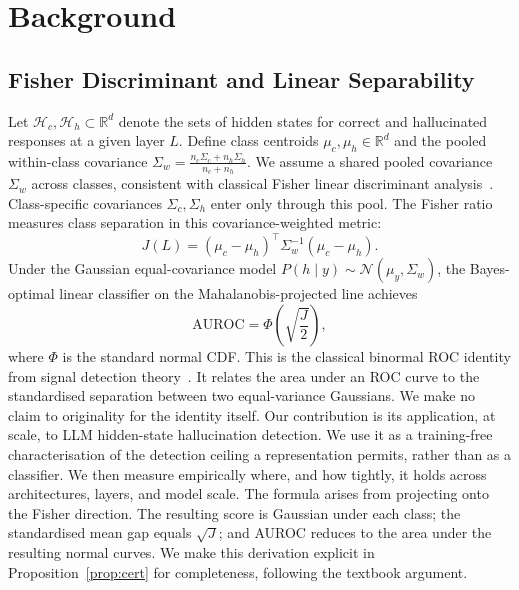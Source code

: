 \documentclass[10pt,twocolumn]{article}
\newcommand{\FloatBarrier}{\clearpage}
\begin{document}
\FloatBarrier
\section{Background}
\label{sec:background}

\subsection{Fisher Discriminant and Linear Separability}
\label{sec:background-fisher}

Let $\mathcal{H}_c, \mathcal{H}_h \subset \mathbb{R}^d$ denote the sets of
hidden states for correct and hallucinated responses at a given layer $L$.
Define class centroids $\mu_c, \mu_h \in \mathbb{R}^d$ and the pooled
within-class covariance
$\Sigma_w = \frac{n_c \Sigma_c + n_h \Sigma_h}{n_c + n_h}.$
We assume a shared pooled covariance $\Sigma_w$ across classes,
consistent with classical Fisher linear discriminant
analysis~\citep{fisher1936use}. Class-specific covariances $\Sigma_c,
\Sigma_h$ enter only through this pool.
The Fisher ratio measures class separation in this covariance-weighted metric:
\begin{equation}
  J(L) = (\mu_c - \mu_h)^\top \Sigma_w^{-1} (\mu_c - \mu_h).
  \label{eq:fisher}
\end{equation}
Under the Gaussian equal-covariance model
$P(h \mid y) \sim \mathcal{N}(\mu_y, \Sigma_w)$,
the Bayes-optimal linear classifier on the Mahalanobis-projected line
achieves
\begin{equation}
  \text{AUROC} = \Phi\!\left(\sqrt{\frac{J}{2}}\right),
  \label{eq:auroc-bound}
\end{equation}
where $\Phi$ is the standard normal CDF. This is the classical binormal
ROC identity from signal detection
theory~\citep{green1966signal,bamber1975area,hanley1982meaning}. It
relates the area under an ROC curve to the standardised separation
between two equal-variance Gaussians. We make no claim to originality
for the identity itself. Our contribution is its application, at scale,
to LLM hidden-state hallucination detection. We use it as a
training-free characterisation of the detection ceiling a
representation permits, rather than as a classifier. We then measure
empirically where, and how tightly, it holds across architectures,
layers, and model scale. The formula arises from projecting onto the
Fisher direction. The resulting score is Gaussian under each class; the
standardised mean gap equals $\sqrt{J}$; and AUROC reduces to the area
under the resulting normal curves. We make this derivation explicit in
Proposition~\ref{prop:cert} for completeness, following the textbook
argument.
\end{document}
